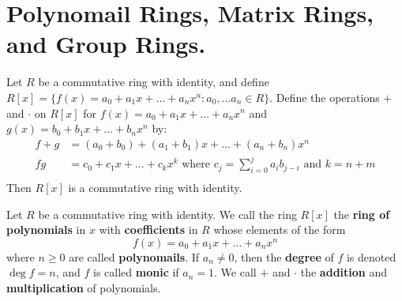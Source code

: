 \section{Polynomail Rings, Matrix Rings, and Group Rings.}
\label{section_5.2}

\begin{theorem}\label{theorem_5.2.1}
    Let $R$ be a commutative ring with identity, and define $R[x]=
    \{f(x)=a_0+a_1x+\dots+a_nx^n : a_0, \dots a_n \in R\}$. Define the
    operations $+$ and  $\cdot$ on $R[x]$ for $f(x)=a_0+a_1x+\dots+a_nx^n$ and
    $g(x)=b_0+b_1x+\dots+b_nx^n$ by:
    \begin{align*}
        f+g &=  (a_0+b_0)+(a_1+b_1)x+\dots+(a_n+b_n)x^n \\
        fg  &=  c_0+c_1x+\dots+c_kx^k \text{ where }
        c_j=\sum_{i=0}^j{a_ib_{j-i}} \text{ and } k=n+m  \\
    \end{align*}
    Then $R[x]$ is a commutative ring with identity.
\end{theorem}

\begin{definition}
    Let $R$ be a commutative ring with identity. We call the ring $R[x]$ the
    \textbf{ring of polynomials} in $x$ with \textbf{coefficients} in $R$ whose
    elements of the form
    \begin{equation*}
        f(x)=a_0+a_1x+\dots+a_nx^n
    \end{equation*}
    where $n \geq 0$ are called \textbf{polynomails}. If $a_n \neq 0$, then the
     \textbf{degree} of $f$ is  denoted $\deg{f}=n$, and $f$ is called
     \textbf{monic} if $a_n=1$. We call $+$ and $\cdot$ the  \textbf{addition}
     and \textbf{multiplication} of polynomials.
\end{definition}

